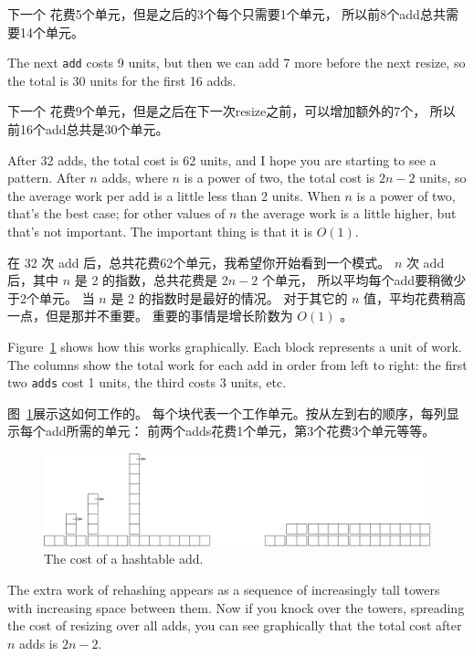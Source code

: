 下一个  花费5个单元，但是之后的3个每个只需要1个单元，
所以前8个add总共需要14个单元。

The next {\tt add} costs 9 units, but then we can add 7 more
before the next resize, so the total is 30 units for the
first 16 adds.

下一个  花费9个单元，但是之后在下一次resize之前，可以增加额外的7个，
所以前16个add总共是30个单元。

After 32 adds, the total cost is 62 units, and I hope you are starting
to see a pattern.  After $n$ adds, where $n$ is a power of two, the
total cost is $2n-2$ units, so the average work per add is
a little less than 2 units.  When $n$ is a power of two, that's
the best case; for other values of $n$ the average work is a little
higher, but that's not important.  The important thing is that it
is $O(1)$.

在 32 次 add 后，总共花费62个单元，我希望你开始看到一个模式。
$n$ 次 add 后，其中 $n$ 是 2 的指数，总共花费是 $2n-2$ 个单元，
所以平均每个add要稍微少于2个单元。
当 $n$ 是 2 的指数时是最好的情况。
对于其它的 $n$ 值，平均花费稍高一点，但是那并不重要。
重要的事情是增长阶数为 $O(1)$ 。

Figure~\ref{fig.hash} shows how this works graphically.  Each
block represents a unit of work.  The columns show the total
work for each add in order from left to right: the first two
{\tt adds} cost 1 units, the third costs 3 units, etc.

图~\ref{fig.hash}展示这如何工作的。
每个块代表一个工作单元。按从左到右的顺序，每列显示每个add所需的单元：
前两个adds花费1个单元，第3个花费3个单元等等。

\begin{figure}
\centerline{\includegraphics[width=5.5in]{../source/figs/towers.pdf}}
\caption{The cost of a hashtable add.\label{fig.hash}}
\end{figure}

The extra work of rehashing appears as a sequence of increasingly
tall towers with increasing space between them.  Now if you knock
over the towers, spreading the cost of resizing over all
adds, you can see graphically that the total cost after $n$
adds is $2n - 2$.

